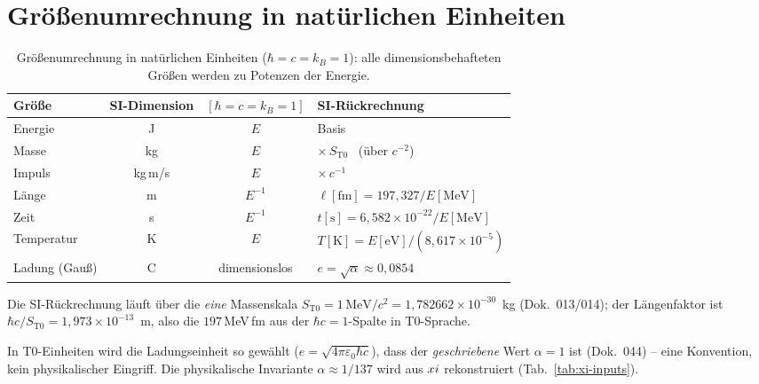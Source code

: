 \section{Größenumrechnung in natürlichen Einheiten}

\begin{table}[htbp]
  \centering
  \caption{Größenumrechnung in natürlichen Einheiten ($\hbar=c=k_B=1$):
           alle dimensionsbehafteten Größen werden zu Potenzen der Energie.}
  \label{tab:nat-umrechnung}
  {\small
  \begin{tabular}{lccl}
    \toprule
    Größe & SI-Dimension & $[\hbar=c=k_B=1]$ & SI-Rückrechnung \\
    \midrule
    Energie       & J        & $E$           & Basis \\
    Masse         & kg       & $E$           & $\times\,S_{\mathrm{T0}}$ \ (über $c^{-2}$) \\
    Impuls        & kg\,m/s  & $E$           & $\times\,c^{-1}$ \\
    Länge         & m        & $E^{-1}$      & $\ell[\mathrm{fm}]=197{,}327/E[\mathrm{MeV}]$ \\
    Zeit          & s        & $E^{-1}$      & $t[\mathrm{s}]=6{,}582\times10^{-22}/E[\mathrm{MeV}]$ \\
    Temperatur    & K        & $E$           & $T[\mathrm{K}]=E[\mathrm{eV}]/(8{,}617\times10^{-5})$ \\
    Ladung (Gauß) & C        & dimensionslos & $e=\sqrt{\alpha}\approx0{,}0854$ \\
    \bottomrule
  \end{tabular}}

  \medskip
  \footnotesize
  Die SI-Rückrechnung läuft über die \emph{eine} Massenskala
  $S_{\mathrm{T0}} = 1\,\mathrm{MeV}/c^2 = 1{,}782662\times10^{-30}$~kg (Dok.~013/014);
  der Längenfaktor ist $\hbar c/S_{\mathrm{T0}} = 1{,}973\times10^{-13}$~m, also die
  $197$\,MeV\,fm aus der $\hbar c=1$-Spalte in T0-Sprache.\par\smallskip
  In T0-Einheiten wird die Ladungseinheit so gewählt
  ($e=\sqrt{4\pi\varepsilon_0\hbar c}$), dass der \emph{geschriebene} Wert
  $\alpha=1$ ist (Dok.~044) -- eine Konvention, kein physikalischer Eingriff.
  Die physikalische Invariante $\alpha\approx1/137$ wird aus $xi$ rekonstruiert
  (Tab.~\ref{tab:xi-inputs}).
\end{table}

